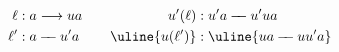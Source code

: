 \[
\begin{aligned}
\ell &: a\longrightarrow ua\\
\ell' &: a\mathbin{-\!\!-}u'a
\end{aligned}
\qquad
\begin{aligned}
u'(\ell)&:u'a\mathbin{-\!\!-}u'ua\\
\uline{u(\ell')}&:\uline{ua\mathbin{-\!\!-}uu'a}
\end{aligned}
\]
